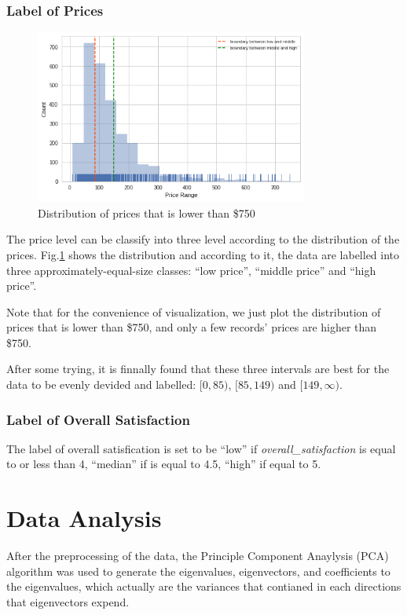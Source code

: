 \documentclass[12pt]{article}
\begin{document}
\subsubsection{Label of Prices}
\begin{figure}[htb]
\centering
\includegraphics[width = 0.8\textwidth]{images/price-distr.png}
\caption{Distribution of prices that is lower than \$750}
\label{fig:price-distr}
\end{figure}
The price level can be classify into three level according to the distribution of the prices. Fig.\ref{fig:price-distr} shows the distribution and according to it, the data are labelled into three approximately-equal-size classes: ``low price'', ``middle price'' and ``high price''.\par
 Note that for the convenience of visualization, we just plot the distribution of prices that is lower than \$750, and only a few records' prices are higher than \$750.
 \par
 After some trying, it is finnally found that these three intervals are best for the data to be evenly devided and labelled: \([0,85)\), \([85, 149)\) and \([149, \infty)\).
\subsubsection{Label of Overall Satisfaction}
The label of overall satisfication is set to be ``low'' if \textit{overall\_satisfaction} is equal to or less than 4, ``median'' if is equal to 4.5, ``high'' if equal to 5.
\section{Data Analysis}
After the preprocessing of the data, the Principle Component Anaylysis (PCA) algorithm was used to generate the eigenvalues, eigenvectors, and coefficients to the eigenvalues, which actually are the variances that contianed in each directions that eigenvectors expend.
\end{document}
